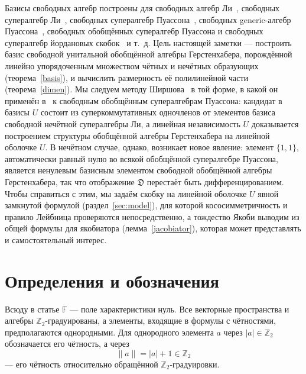 \documentclass[11pt,reqno]{amsart}
\newcommand{\F}{\mathbb F}
\newcommand{\Z}{\mathbb Z}
\newcommand{\D}{\mathfrak D}
\newcommand{\rp}[1]{\|#1\|}
\theoremstyle{plain}
\theoremstyle{definition}
\theoremstyle{remark}
\begin{document}
Базисы свободных алгебр построены для свободных алгебр Ли~\cite{Hall50,shirshov,chi,Reu93}, свободных супералгебр Ли~\cite{S86,BMPZ,BKLM}, свободных супералгебр Пуассона~\cite{She93}, свободных generic-алгебр Пуассона~\cite{KSU}, свободных обобщённых супералгебр Пуассона и свободных супералгебр йордановых скобок~\cite{K17} и т.~д.
Цель настоящей заметки --- построить базис свободной унитальной обобщённой алгебры Герстенхабера, порождённой линейно упорядоченным множеством чётных и нечётных образующих (теорема~\ref{basis}), и вычислить размерность её полилинейной части (теорема~\ref{dimen}).
Мы следуем методу Ширшова~\cite{shirshov} в той форме, в какой он применён в~\cite{K17} к свободным обобщённым супералгебрам Пуассона: кандидат в базисы $U$ состоит из суперкоммутативных одночленов от элементов базиса свободной нечётной супералгебры Ли, а линейная независимость $U$ доказывается построением структуры обобщённой алгебры Герстенхабера на линейной оболочке $U$.
В нечётном случае, однако, возникает новое явление: элемент $\{1,1\}$, автоматически равный нулю во всякой обобщённой супералгебре Пуассона, является ненулевым базисным элементом свободной обобщённой алгебры Герстенхабера, так что отображение $\D$ перестаёт быть дифференцированием.
Чтобы справиться с этим, мы задаём скобку на линейной оболочке $U$ явной замкнутой формулой (раздел~\ref{sec:model}), для которой кососимметричность и правило Лейбница проверяются непосредственно, а тождество Якоби выводим из общей формулы для якобиатора (лемма~\ref{jacobiator}), которая может представлять и самостоятельный интерес.

\section{Определения и обозначения}

Всюду в статье $\F$ --- поле характеристики нуль.
Все векторные пространства и алгебры $\Z_2$-градуированы, а элементы, входящие в формулы с чётностями, предполагаются однородными.
Для однородного элемента $a$ через $|a|\in\Z_2$ обозначается его чётность, а через
$$
\rp{a}=|a|+1\in\Z_2
$$
--- его чётность относительно обращённой $\Z_2$-градуировки.
\end{document}
